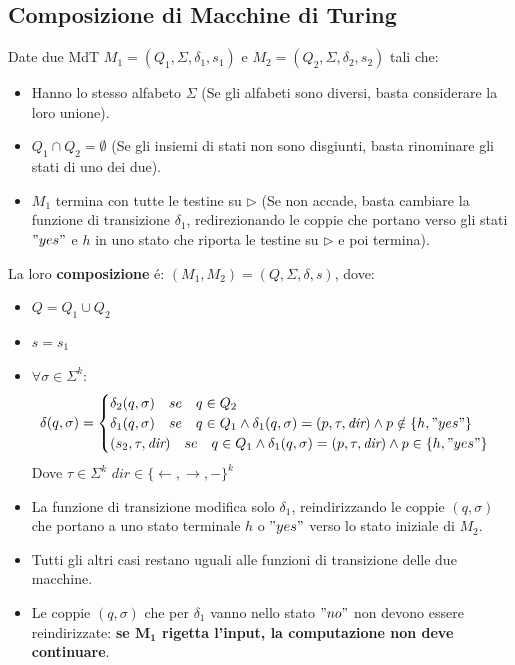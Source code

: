 \subsection{Composizione di Macchine di Turing}
Date due MdT $M_1 = (Q_1, \Sigma, \delta_1, s_1)$ e $M_2 = (Q_2, \Sigma, \delta_2, s_2)$ tali che:
\begin{itemize}
	\item Hanno lo stesso alfabeto $\Sigma$ 
	\subitem (Se gli alfabeti sono diversi, basta considerare la loro unione).
	\item $Q_1 \cap Q_2 = \emptyset$ 
	\subitem (Se gli insiemi di stati non sono disgiunti, basta rinominare gli stati di uno dei due).
	\item $M_1$ termina con tutte le testine su $\triangleright$ 
	\subitem (Se non accade, basta cambiare la funzione di transizione $\delta_1$, redirezionando le coppie che portano verso gli stati $"yes"$ e $h$ in uno stato che riporta le testine su $\triangleright$ e poi termina).
\end{itemize}

La loro \textbf{composizione} é: $(M_1, M_2) =  (Q, \Sigma, \delta, s)$, dove: 
\begin{itemize}
	\item $Q = Q_1 \cup Q_2$
	\item $s = s_1$
	\item $\forall \sigma \in \Sigma^k$:
	\[
	\delta(q, \sigma) =
	\begin{cases} 
		\delta_2(q, \sigma)  \quad se \quad q \in Q_2 \\
		\delta_1(q, \sigma) \quad se \quad q \in Q_1 \land \delta_1(q, \sigma)  = (p, \tau, \textit{dir}) \land p \notin \{h, "yes"\} \\
		(s_2, \tau, \textit{dir}) \quad se \quad q \in Q_1 \land  \delta_1(q, \sigma)  = (p, \tau, \textit{dir}) \land p \in \{h, "yes"\} \\
	\end{cases}
	\]
	Dove $\tau \in \Sigma^k$ \quad $\textit{dir} \in \{\leftarrow, \rightarrow, -\}^k$
\end{itemize}

\begin{itemize}
	\item La funzione di transizione modifica solo $\delta_1$, reindirizzando le coppie $(q, \sigma)$ che portano a uno stato terminale $h$ o $"yes"$ verso lo stato iniziale di $M_2$. 
	\item Tutti gli altri casi restano uguali alle funzioni di transizione delle due macchine.
	\item Le coppie $(q, \sigma)$ che per $\delta_1$ vanno nello stato $"no"$ non devono essere reindirizzate: \textbf{se $\mathbf{M_1}$ rigetta l'input, la computazione non deve continuare}.
\end{itemize}


